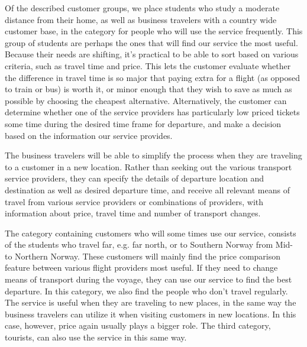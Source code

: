 Of the described customer groups, we place students who study a moderate distance from their home, as well as business travelers with a country wide customer base, in the category for people who will use the service frequently. This group of students are perhaps the ones that will find our service the most useful. Because their needs are shifting, it's practical to be able to sort based on various criteria, such as travel time and price. This lets the customer evaluate whether the difference in travel time is so major that paying extra for a flight (as opposed to train or bus) is worth it, or minor enough that they wish to save as much as possible by choosing the cheapest alternative. Alternatively, the customer can determine whether one of the service providers has particularly low priced tickets some time during the desired time frame for departure, and make a decision based on the information our service provides.

The business travelers will be able to simplify the process when they are traveling to a customer in a new location. Rather than seeking out the various transport service providers, they can specify the details of departure location and destination as well as desired departure time, and receive all relevant means of travel from various service providers or combinations of providers, with information about price, travel time and number of transport changes.

The category containing customers who will some times use our service, consists of the students who travel far, e.g. far north, or to Southern Norway from Mid- to Northern Norway. These customers will mainly find the price comparison feature between various flight providers most useful. If they need to change means of transport during the voyage, they can use our service to find the best departure. In this category, we also find the people who don't travel regularly. The service is useful when they are traveling to new places, in the same way the business travelers can utilize it when visiting customers in new locations. In this case, however, price again usually plays a bigger role. The third category, tourists, can also use the service in this same way.